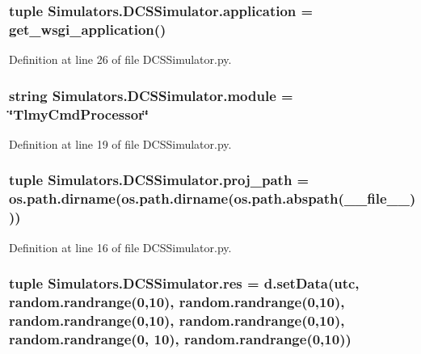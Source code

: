 \subsubsection[{application}]{\setlength{\rightskip}{0pt plus 5cm}tuple Simulators.\+D\+C\+S\+Simulator.\+application = get\+\_\+wsgi\+\_\+application()}\label{namespace_simulators_1_1_d_c_s_simulator_af99eec651a96ed08a62cecb682291c05}


Definition at line 26 of file D\+C\+S\+Simulator.\+py.

\hypertarget{namespace_simulators_1_1_d_c_s_simulator_ab53903f45ca090c65dea3afd551b94f0}{}
\subsubsection[{module}]{\setlength{\rightskip}{0pt plus 5cm}string Simulators.\+D\+C\+S\+Simulator.\+module = \char`\"{}Tlmy\+Cmd\+Processor\char`\"{}}\label{namespace_simulators_1_1_d_c_s_simulator_ab53903f45ca090c65dea3afd551b94f0}


Definition at line 19 of file D\+C\+S\+Simulator.\+py.

\hypertarget{namespace_simulators_1_1_d_c_s_simulator_a0e84958286112773d2ba1bebd1609392}{}
\subsubsection[{proj\+\_\+path}]{\setlength{\rightskip}{0pt plus 5cm}tuple Simulators.\+D\+C\+S\+Simulator.\+proj\+\_\+path = os.\+path.\+dirname(os.\+path.\+dirname(os.\+path.\+abspath(\+\_\+\+\_\+file\+\_\+\+\_\+)))}\label{namespace_simulators_1_1_d_c_s_simulator_a0e84958286112773d2ba1bebd1609392}


Definition at line 16 of file D\+C\+S\+Simulator.\+py.

\hypertarget{namespace_simulators_1_1_d_c_s_simulator_a3f7ba89b671bdb9a730f97a7e7268639}{}
\subsubsection[{res}]{\setlength{\rightskip}{0pt plus 5cm}tuple Simulators.\+D\+C\+S\+Simulator.\+res = d.\+set\+Data(utc, random.\+randrange(0,10), random.\+randrange(0,10), random.\+randrange(0,10), random.\+randrange(0,10), random.\+randrange(0, 10), random.\+randrange(0,10))}\label{namespace_simulators_1_1_d_c_s_simulator_a3f7ba89b671bdb9a730f97a7e7268639}


